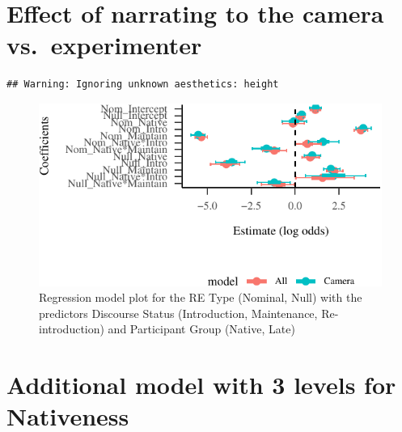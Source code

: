 \documentclass[review]{elsarticle} %
\begin{document}
\clearpage

\onecolumn

\hypertarget{effect-of-narrating-to-the-camera-vs.-experimenter}{%
\section{Effect of narrating to the camera
vs.~experimenter}\label{effect-of-narrating-to-the-camera-vs.-experimenter}}

\label{section:c}

\begin{verbatim}
## Warning: Ignoring unknown aesthetics: height
\end{verbatim}

\begin{figure}
\centering
\includegraphics{manuscript_v2_files/figure-latex/model-camera-1.pdf}
\caption{Regression model plot for the RE Type (Nominal, Null) with the
predictors Discourse Status (Introduction, Maintenance, Re-introduction)
and Participant Group (Native, Late)}
\end{figure}

\clearpage

\hypertarget{additional-model-with-3-levels-for-nativeness}{%
\section{Additional model with 3 levels for
Nativeness}\label{additional-model-with-3-levels-for-nativeness}}

\label{section:d}
\end{document}
